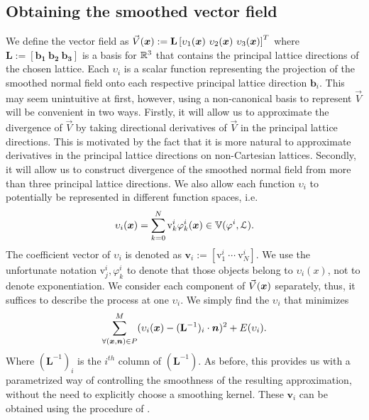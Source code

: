 \subsection{Obtaining the smoothed vector field} \label{sec:getting_vd}
\label{sec:obtainingV}
We define the vector field as $\vec{V}(\vx):=\mathbf{L} \left[\upsilon_1(\vx) \ \upsilon_2(\vx) \ \upsilon_3(\vx)\right]^T$ where $\mathbf{L := [b_1 \ b_2 \ b_3]}$ is a basis for $\realn^3$ that contains the principal lattice directions of the chosen lattice.
Each $\upsilon_i$ is a scalar function representing the projection of the smoothed normal field onto each respective principal lattice direction $\mathbf{b}_i$. 
This may seem unintuitive at first, however, using a non-canonical basis to represent $\vec{V}$ will be convenient in two ways. 
Firstly, it will allow us to approximate the divergence of $\vec{V}$ by taking directional derivatives of $\vec{V}$ in the principal lattice directions. 
This is motivated by the fact that it is more natural to approximate derivatives in the principal lattice directions on non-Cartesian lattices. 
Secondly, it will allow us to construct divergence of the smoothed normal field from more than three principal lattice directions. 
We also allow each function $\upsilon_i$ to potentially be represented in different function spaces, i.e. {\small 
\begin{equation} 
	\upsilon_i(\vx) = \sum_{k=0}^N \text{v}_k^i \varphi_k^i(\vx) \in \aspace{\lattice{L}}{\varphi^i}.
\end{equation}}
The coefficient vector of $\upsilon_i$ is denoted as $\mathbf{v}_i:=\left[\text{v}_1^i \ \cdots \ \text{v}_N^i \right]$.
We use the unfortunate notation $\text{v}_j^i, \varphi_k^i$ to denote that those objects belong to $\upsilon_i(x)$, not to denote exponentiation. 
We consider each component of $\vec{V}(\vx)$ separately, thus, it suffices to describe the process at one $\upsilon_i$. 
We simply find the $\upsilon_i$ that minimizes {\small 
\begin{equation} \label{eq:vari_eqn}
 	\sump_{\forall (\vx,\vn) \in P }^{M} (\upsilon_i(\vx) - (\mathbf{L}^{-1})_i \cdot \vect{n})^2 + E(\upsilon_i).
\end{equation} }
Where $(\mathbf{L}^{-1})_i$ is the $i^{th}$ column of $(\mathbf{L}^{-1}).$ 
As before, this provides us with a parametrized way of controlling the smoothness of the resulting approximation, without the need to explicitly choose a smoothing kernel. 
These $\mathbf{v}_i$ can be obtained using the procedure of .


